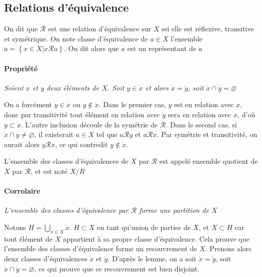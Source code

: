\documentclass{scrartcl}
\begin{document}
		\subsection{Relations d'équivalence}
			On dit que $\mathcal{R}$ est une relation d'équivalence sur $X$ ssi elle est réflexive, transitive et symétrique.
			On note classe d'équivalence de $a\in X$ l'ensemble $\dot{a} = \left\{x\in X \big| x\mathcal{R}a\right\}$. On dit
			alors que $a$ est un représentant de $\dot{a}$

			\paragraph{Propriété} \textsl{Soient $x$ et $y$ deux éléments de $X$. 
				Soit $y\in\dot{x}$ et alors $\dot{x} = \dot{y}$, soit $\dot{x}\cap\dot{y} = \varnothing$}
			\begin{demo}
				\item On a forcément $y \in \dot{x}$ ou $y\not\in\dot{x}$. Dans le premier cas,
				$y$ est en relation avec $x$, donc par transitivité tout élément en relation avec $y$ sera en relation avec
				$x$, d'où $\dot{y} \subset \dot{x}$. L'autre inclusion découle de la symétrie de $\mathcal{R}$. Dans le second
				cas, si $\dot{x}\cap\dot{y} \neq \varnothing$, il existerait $a\in X$ tel que $a\mathcal{R}y$ et $a\mathcal{R}x$.
				Par symétrie et transitivité, on aurait alors $y\mathcal{R}x$, ce qui contredit $y\not\in\dot{x}$.
			\end{demo}

			L'ensemble des classes d'équivalences de $X$ par $\mathcal{R}$ est appelé ensemble quotient de $X$ par $\mathcal{R}$,
			et est noté $X/R$

			\paragraph{Corrolaire} \textsl{L'ensemble des classes d'équivalence par $\mathcal{R}$ forme une partition de $X$}
			\begin{demo}
				\item Notons $H = \bigcup\limits_{x\in X} \dot{x}$. $H \subset X$ en tant qu'union de parties
				de $X$, et $X \subset H$ car tout élément de $X$ appartient à sa propre classe d'équivalence. 
				Cela prouve que l'ensemble des classes d'équivalence forme un recouvrement de $X$.
				Prenons alors deux classes d'équivalences $\dot{x}$ et $\dot{y}$. 
				D'après le lemme, on a soit $\dot{x}=\dot{y}$, soit $\dot{x}\cap\dot{y} = \varnothing$, 
				ce qui prouve que ce recouvrement est bien disjoint.
			\end{demo}
\end{document}
